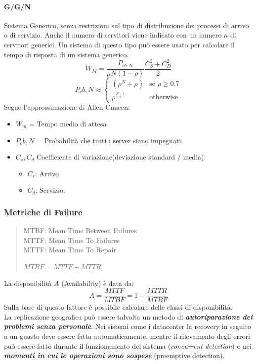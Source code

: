 \documentclass{article}
\begin{document}
			\paragraph{G/G/N}\label{ggn}
		Sistema Generico, senza restrizioni sul tipo di distribuzione dei
		processi di arrivo o di servizio. Anche il numero di servitori viene
		indicato con un numero \(n\) di servitori generici. Un sistema di questo
		tipo può essere usato per calcolare il tempo di risposta
		di un sistema generico.
		\[
		W_M = \frac{P_{cb,N}}{\mu N(1-\rho)}\frac{C^2_S+C^2_D}{2}
		\]
		\[
		P_cb,N \approx
		\begin{cases}
			(\rho^N+\rho) & \text{se $\rho \geq 0.7$}\\
			\rho^{\frac{N+1}{2}} & \text{otherwise}
		\end{cases}
		\]
		Segue l'approssimazione di Allen-Cuneen:
		\begin{itemize}
			\item $W_m$ = Tempo medio di attesa
			\item $P_cb,N$ = Probabilità che tutti i server siano impegnati.
			\item $C_s, C_d$ Coefficiente di variazione(deviazione standard / media):
			\begin{itemize}
				\item $C_s$: Arrivo
				\item $C_d$: Servizio.
			\end{itemize}
		\end{itemize}
		
		\subsubsection{Metriche di Failure}\label{metriche-di-failure}
		\begin{quote}
			MTBF: Mean Time Between Failures \\
			MTTF: Mean Time To Failures \\
			MTTF: Mean Time To Repair
			
			\(MTBF = MTTF + MTTR\)
		\end{quote}
		
		La disponibilità \(A\) (Availability) è data da: \[
		A = \frac{MTTF}{MTBF} = 1 - \frac{MTTR}{MTBF}
		\] Sulla base di questo fattore è possibile calcolare delle
		classi di disponibilità.\\
		
		La replicazione geografica può essere talvolta un metodo di \textbf{\emph{autoriparazione dei problemi senza personale}}. Nei sistemi come i datacenter la recovery in seguito a un guasto deve essere
		fatta automaticamente, mentre il rilevamento degli errori può essere fatto
		durante il funzionamento del sistema (\emph{concurrent detection}) o nei \textbf{\emph{momenti in cui le operazioni sono	sospese}} (preemptive detection).
		
\end{document}
